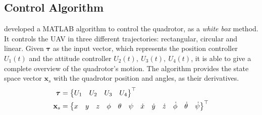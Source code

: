 \subsection{Control Algorithm}

\textcite{geronel2023} developed a MATLAB algorithm to control the quadrotor, as a \emph{white box} method. 
It controls the UAV in three different trajectories: rectangular, circular and linear.
Given \(\mathbf{\tau}\) as the input vector, which represents the position controller \(U_1(t)\) and the attitude controller \(U_2(t),\ U_3(t),\ U_4(t)\), it is able to give a complete overview of the quadrotor's motion.
The algorithm provides the state space vector \(\mathbf{x}_s\) with the quadrotor position and angles, as their derivatives.
%
\begin{align}
    \bm{\tau} &= \begin{Bmatrix}
        U_1 & U_2 & U_3 & U_4
    \end{Bmatrix}^{\top} \\
    \setcounter{MaxMatrixCols}{13}
    \mathbf{x}_s &=
    \begin{Bmatrix}
        x&y&z&\phi&\theta&\psi&\dot{x}&\dot{y}&\dot{z}&\dot{\phi}&\dot{\theta}&\dot{\psi}
    \end{Bmatrix}^{\top}
    \label{eq:xs_vector_matlab}
\end{align}